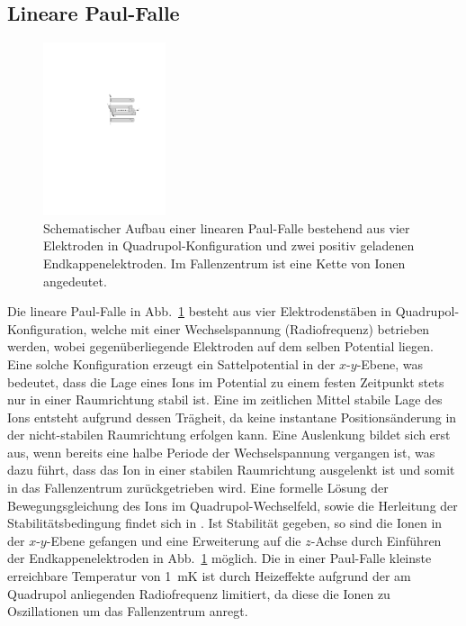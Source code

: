 \documentclass[twocolumn]{revtex4}
\begin{document}
\subsection{Lineare Paul-Falle}
\begin{figure}[h]
	\vspace{-0.2cm}
	\centering
	\includegraphics[width=0.32\textwidth]{./figures/lineare_paulfalle.pdf}
	\caption{Schematischer Aufbau einer linearen Paul-Falle  bestehend aus vier Elektroden in Quadrupol-Konfiguration und zwei positiv geladenen Endkappenelektroden. Im Fallenzentrum ist eine Kette von Ionen angedeutet.}
	\label{fig:paulfalle}
\end{figure}
Die lineare Paul-Falle in Abb.~\ref{fig:paulfalle} besteht aus vier Elektrodenstäben in Quadrupol-Konfiguration, welche mit einer Wechselspannung (Radiofrequenz) betrieben werden, wobei gegenüberliegende Elektroden auf dem selben Potential liegen.
Eine solche Konfiguration erzeugt ein Sattelpotential in der $x$-$y$-Ebene, was bedeutet, dass die Lage eines Ions im Potential zu einem festen Zeitpunkt stets nur in einer Raumrichtung stabil ist.
Eine im zeitlichen Mittel stabile Lage des Ions entsteht aufgrund dessen Trägheit, da keine instantane Positionsänderung in der nicht-stabilen Raumrichtung erfolgen kann.
Eine Auslenkung bildet sich erst aus, wenn bereits eine halbe Periode der Wechselspannung vergangen ist, was dazu führt, dass das Ion in einer stabilen Raumrichtung ausgelenkt ist und somit in das Fallenzentrum zurückgetrieben wird.
Eine formelle Lösung der Bewegungsgleichung des Ions im Quadrupol-Wechselfeld, sowie die Herleitung der Stabilitätsbedingung findet sich in \cite{foot}.
Ist Stabilität gegeben, so sind die Ionen in der $x$-$y$-Ebene gefangen und eine Erweiterung auf die $z$-Achse durch Einführen der Endkappenelektroden in Abb.~\ref{fig:paulfalle} möglich.
Die in einer Paul-Falle kleinste erreichbare Temperatur von \SI{1}{mK} ist durch Heizeffekte aufgrund der am Quadrupol anliegenden Radiofrequenz limitiert, da diese die Ionen zu Oszillationen um das Fallenzentrum anregt.
\end{document}
